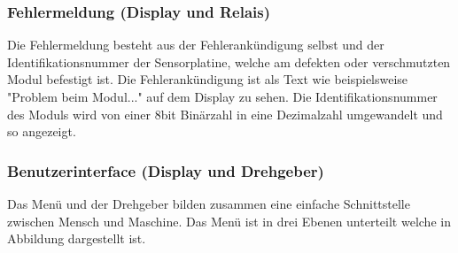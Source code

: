 \subsubsection{Fehlermeldung (Display und Relais)}
Die Fehlermeldung besteht aus der Fehlerankündigung selbst und der Identifikationsnummer der Sensorplatine, welche am defekten oder verschmutzten Modul befestigt ist. Die Fehlerankündigung ist als Text wie beispielsweise "Problem beim Modul..." auf dem Display zu sehen. Die Identifikationsnummer des Moduls wird von einer 8bit Binärzahl in eine Dezimalzahl umgewandelt und so angezeigt.
\subsubsection{Benutzerinterface (Display und Drehgeber)}
Das Menü und der Drehgeber bilden zusammen eine einfache Schnittstelle zwischen Mensch und Maschine. Das Menü ist in drei Ebenen unterteilt welche in Abbildung  dargestellt ist.
